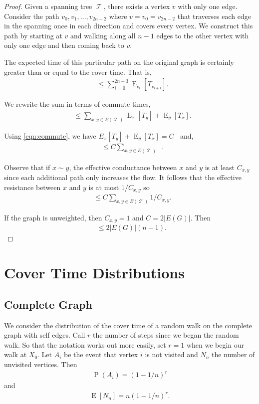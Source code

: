 \documentclass[12pt]{article}
\theoremstyle{definition}
\DeclareMathOperator{\E}{\mathrm{E}}		     %
\DeclareMathOperator{\pr}{\mathrm{P}}		     %
\DeclareMathOperator{\tcov}{t_\textrm{cov}}      %
\DeclareMathOperator{\Rxy}{R_{\textrm{x,y}}}     %
\DeclareMathOperator{\T}{\mathcal{T}}            %
\begin{document}
\begin{proof}
Given a spanning tree $\T$, there exists a vertex $v$ with only one edge.
Consider the path $v_0, v_1, \ldots, v_{2n-2}$ where $v=v_0=v_{2n-2}$
that traverses each edge in the spanning once in each direction
and covers every vertex.
We construct this path by starting at $v$ and walking along all $n-1$ edges to the
other vertex with only one edge and then coming back to $v$.

The expected time of this particular path on the original graph is certainly 
greater than or equal to the cover time. That is,
\begin{align}
\tcov &\leq \sum_{i=0}^{2n-3} \E_{v_i}[T_{v_{i+1}}]. \nonumber
\end{align}

We rewrite the sum in terms of commute times,
\begin{align}
\tcov &\leq \sum_{x,y \in E(\T)} \E_x[T_y] + \E_y[T_x]. \nonumber
\end{align}

Using \cref{eqn:commute}, we have $E_x[T_y] + \E_y[T_x] = C \Rxy$ and,
\begin{align}
\tcov &\leq C \sum_{x,y \in E(\T)} \Rxy. \nonumber
\end{align}

Observe that if $x \sim y$,
the effective conductance between $x$ and $y$ is at least $C_{x,y}$
since each additional path only increases the flow.
It follows that the effective resistance between $x$ and $y$ is at most $1 / C_{x,y}$ so
\begin{align}
\tcov &\leq C \sum_{x,y \in E(\T)} 1 / C_{x,y}. \nonumber
\end{align}

If the graph is unweighted, then $C_{x,y} = 1$ and $C = 2 |E(G)|$.
Then
\begin{align}
\tcov \leq 2 |E(G)| (n-1). \nonumber
\end{align}

\end{proof}


\section{Cover Time Distributions}\label{sec:dist}
\subsection{Complete Graph}\label{sec:complete_dist}
\cite{Du11}
We consider the distribution of the cover time of a random walk
on the complete graph with self edges.
Call $r$ the number of steps since we began the random walk.
So that the notation works out more easily,
set $r=1$ when we begin our walk at $X_0$.
Let $A_i$ be the event that vertex $i$ is not visited and
$N_n$ the number of unvisited vertices.
Then
\begin{align}
\pr(A_i) = (1-1/n)^r \nonumber
\end{align}
and
\begin{align}
\E[N_n] = n(1-1/n)^r. \nonumber
\end{align}
\end{document}
